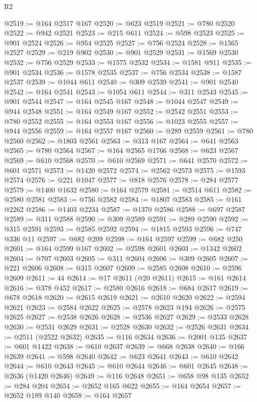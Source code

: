 \begin{lexlean}{R2}
\begin{coremodule}
@2519 := @164 @2517 @167
@2520 := @623 @2519
@2521 := @780 @2520
@2522 := @942 @2521
@2523 := @215 @611
@2524 := @598 @2523
@2525 := @901 @2524
@2526 := @954 @2525
@2527 := @756 @2524
@2528 := @1565 @2527
@2529 := @219 @902
@2530 := @901 @2529
@2531 := @1569 @2530
@2532 := @756 @2529
@2533 := @1575 @2532
@2534 := @1581 @911
@2535 := @901 @2534
@2536 := @1578 @2535
@2537 := @756 @2534
@2538 := @1587 @2537
@2539 := @1044 @611
@2540 := @309 @2539
@2541 := @901 @2540
@2542 := @164 @2541
@2543 := @1054 @611
@2544 := @311 @2543
@2545 := @901 @2544
@2547 := @164 @2545 @167
@2548 := @1044 @2547
@2549 := @944 @2548
@2551 := @164 @2549 @167
@2552 := @2542 @2551
@2553 := @780 @2552
@2555 := @164 @2553 @167
@2556 := @1023 @2555
@2557 := @944 @2556
@2559 := @164 @2557 @167
@2560 := @289 @2559
@2561 := @780 @2560
@2562 := @1803 @2561
@2563 := @313 @167
@2564 := @641 @2563
@2565 := @780 @2564
@2567 := @164 @2565 @1766
@2568 := @623 @2567
@2569 := @610 @2568
@2570 := @610 @2569
@2571 := @641 @2570
@2572 := @601 @2571
@2573 := @1420 @2572
@2574 := @2562 @2573
@2575 := @1593 @2574
@2576 := @221 @1047
@2577 := @818 @2576
@2578 := @284 @2577
@2579 := @1400 @1632
@2580 := @164 @2579
@2581 := @2514 @611
@2582 := @2580 @2581
@2583 := @756 @2582
@2584 := @1807 @2583
@2585 := @161 @2262
@2586 := @1403 @2234
@2587 := @1370 @2586
@2588 := @697 @2587
@2589 := @311 @2588
@2590 := @309 @2589
@2591 := @289 @2590
@2592 := @315 @2591
@2593 := @2585 @2592
@2594 := @1815 @2593
@2596 := @747 @336 @11
@2597 := @682 @209
@2598 := @164 @2597
@2599 := @682 @250
@2601 := @164 @2599 @167
@2602 := @2598 @2601
@2603 := @1342 @2602
@2604 := @707 @2603
@2605 := @311 @2604
@2606 := @309 @2605
@2607 := @221 @2606
@2608 := @315 @2607
@2609 := @2585 @2608
@2610 := @2596 @2609
@2611 := 44
@2614 := @17 @2611 (@20 @2611)
@2615 := @161 @2614
@2616 := @378 @452
@2617 := @2580 @2616
@2618 := @684 @2617
@2619 := @678 @2618
@2620 := @2615 @2619
@2621 := @2610 @2620
@2622 := @2594 @2621
@2623 := @2584 @2622
@2625 := @2578 @2623 @194
@2626 := @2575 @2625
@2627 := @2538 @2626
@2628 := @2536 @2627
@2629 := @2533 @2628
@2630 := @2531 @2629
@2631 := @2528 @2630
@2632 := @2526 @2631
@2634 := @2511 (@2522 @2632)
@2635 := @116 @2634
@2636 := @2001 @135
@2637 := @601 @1422
@2638 := @610 @2637
@2639 := @668 @2638
@2640 := @166 @2639
@2641 := @598 @2640
@2642 := @623 @2641
@2643 := @610 @2642
@2644 := @610 @2643
@2645 := @610 @2644
@2646 := @601 @2645
@2648 := @2636 (@1420 @2646)
@2649 := @116 @2648
@2651 := @658 @98 @135
@2652 := @284 @204
@2654 := @2652 @165 @622
@2655 := @164 @2654
@2657 := @2652 @189 @140
@2658 := @164 @2657

\end{coremodule}
\end{lexlean}
